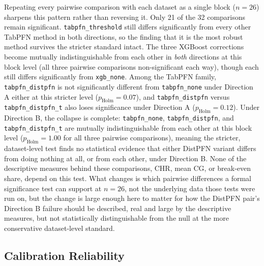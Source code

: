 Repeating every pairwise comparison with each dataset as a single block
($n{=}26$) sharpens this pattern rather than reversing it. Only 21 of the
32 comparisons remain significant. \texttt{tabpfn\_threshold} still
differs significantly from every other TabPFN method in both directions,
so the finding that it is the most robust method survives the stricter
standard intact. The three XGBoost corrections become mutually
indistinguishable from each other in \emph{both} directions at this block
level (all three pairwise comparisons non-significant each way), though
each still differs significantly from \texttt{xgb\_none}. Among the
TabPFN family, \texttt{tabpfn\_distpfn} is not significantly different
from \texttt{tabpfn\_none} under Direction A either at this stricter
level ($p_{\text{Holm}}=0.07$), and \texttt{tabpfn\_distpfn} versus
\texttt{tabpfn\_distpfn\_t} also loses significance under Direction A
($p_{\text{Holm}}=0.12$). Under Direction B, the collapse is complete:
\texttt{tabpfn\_none}, \texttt{tabpfn\_distpfn}, and
\texttt{tabpfn\_distpfn\_t} are mutually indistinguishable from each
other at this block level ($p_{\text{Holm}}=1.00$ for all three pairwise
comparisons), meaning the stricter, dataset-level test finds no
statistical evidence that either DistPFN variant differs from doing
nothing at all, or from each other, under Direction B. None of the
descriptive measures behind these comparisons, CHR, mean CG, or
break-even share, depend on this test. What changes is which pairwise
differences a formal significance test can support at $n{=}26$, not the
underlying data those tests were run on, but the change is large enough
here to matter for how the DistPFN pair's Direction B failure should be
described, real and large by the descriptive measures, but not
statistically distinguishable from the null at the more conservative
dataset-level standard.

\subsection{Calibration Reliability}
\label{sec:results-reliability}

